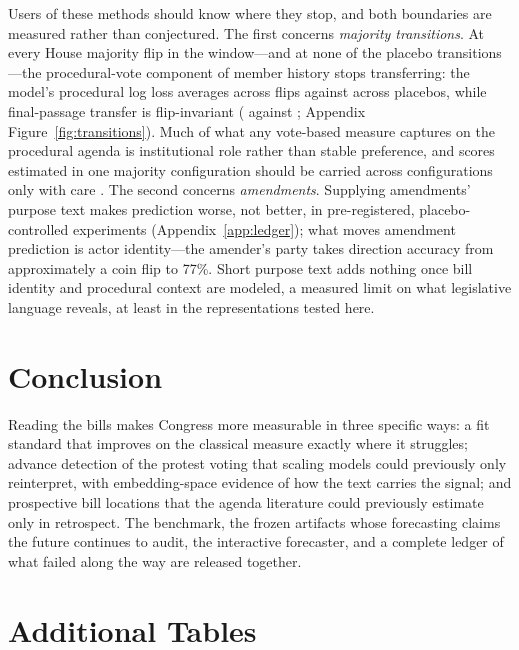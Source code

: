 \documentclass[12pt]{article}
\begin{document}
Users of these methods should know where they stop, and both
boundaries are measured rather than conjectured. The first concerns
\emph{majority transitions}. At every House majority flip in the
window---and at none of the placebo transitions---the
procedural-vote component of member history stops transferring: the
model's procedural log loss averages \flipProcLL{} across flips
against \placeboProcLL{} across placebos, while final-passage
transfer is flip-invariant (\flipPassLL{} against \placeboPassLL;
Appendix Figure~\ref{fig:transitions}). Much of what any vote-based
measure captures on the procedural agenda is institutional role
rather than stable preference, and scores estimated in one majority
configuration should be carried across configurations only with care
\citep{bateman2017house}. The second concerns \emph{amendments}.
Supplying amendments' purpose text makes prediction worse, not
better, in pre-registered, placebo-controlled experiments
(Appendix~\ref{app:ledger}); what moves amendment prediction is actor
identity---the amender's party takes direction accuracy from
approximately a coin flip to 77\%. Short purpose text adds nothing
once bill identity and procedural context are modeled, a measured
limit on what legislative language reveals, at least in the
representations tested here.

\section{Conclusion}

Reading the bills makes Congress more measurable in three specific
ways: a fit standard that improves on the classical measure exactly
where it struggles; advance detection of the protest voting that
scaling models could previously only reinterpret, with
embedding-space evidence of how the text carries the signal; and
prospective bill locations that the agenda literature could
previously estimate only in retrospect. The benchmark, the frozen
artifacts whose forecasting claims the future continues to audit, the
interactive forecaster, and a complete ledger of what failed along
the way are released together.




\appendix

\section{Additional Tables}
\label{app:tables}
\end{document}
